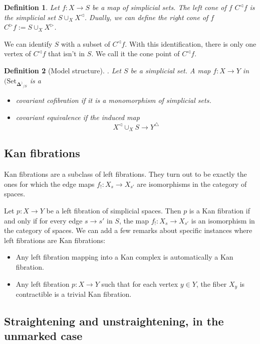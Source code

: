 \documentclass[a4paper, 12pt]{amsart}
\newcommand{\8}{\infty}
\newcommand{\SSet}[1]{\text{Set}_\boldsymbol{\Delta^{#1}}}
\newtheorem{definition}{Definition}
\begin{document}
\begin{definition}
  Let $f:X\rightarrow S$ be a map of simplicial sets. The left cone of $f$ $C^
      {\triangleleft}f$ is the simplicial set $\displaystyle S\cup_X X^{\triangleleft} $. Dually, we can define the right cone of $f$ $C^{\triangleright}f:=\displaystyle S\cup_X X^{\triangleright}$.
\end{definition}

We can identify $S$ with a subset of $C^{\triangleleft}f$. With this identification, there is only one vertex of $C^{\triangleleft}f$ that isn't in $S$. We call it the cone point of $C^{\triangleleft}f$.

\begin{definition}[Model structure]. Let $S$ be a simplicial set. A map $f:X\rightarrow Y$ in $(\SSet)_{/S}$ is a
  \begin{itemize}
    \item covariant cofibration if it is a monomorphism of simplicial sets.
    \item covariant equivalence if the induced map \[X^{\triangleleft}\displaystyle \cup_X S \rightarrow Y^{\triangle}\]
  \end{itemize}
\end{definition}

\subsection{Kan fibrations}
Kan fibrations are a subclass of left fibrations. They turn out to be exactly the ones for which the edge maps $f_!:X_s\rightarrow X_{s'}$ are isomorphisms in the category of spaces.

Let $p:X\rightarrow Y$ be a left fibration of simplicial spaces. Then $p$ is a Kan fibration if and only if for every edge $s\rightarrow s'$ in $S$, the map $f_!:X_s\rightarrow X_{s'}$ is an isomorphism in the category of spaces.
We can add a few remarks about specific instances where left fibrations are Kan fibrations:
\begin{itemize}
  \item Any left fibration mapping into a Kan complex is automatically a Kan fibration.
  \item Any left fibration $p:X\rightarrow Y$ such that for each vertex $y\in Y$, the fiber $X_y$ is contractible is a trivial Kan fibration.
\end{itemize}


\subsection{Straightening and unstraightening, in the unmarked case}
\end{document}
